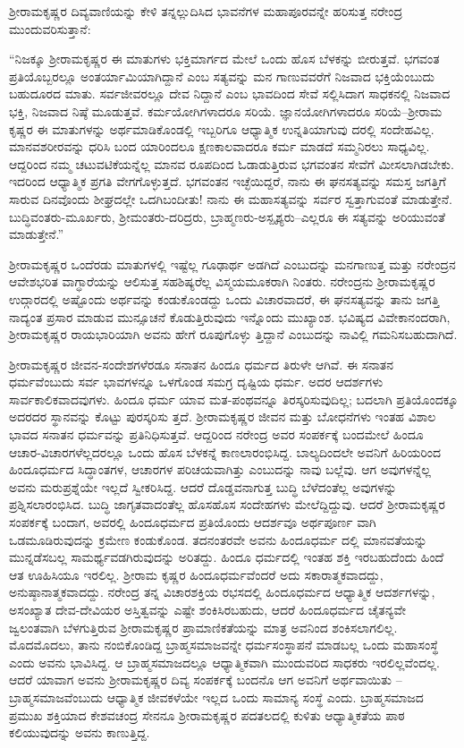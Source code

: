 ಶ್ರೀರಾಮಕೃಷ್ಣರ ದಿವ್ಯವಾಣಿಯನ್ನು ಕೇಳಿ ತನ್ನಲ್ಲುದಿಸಿದ ಭಾವನೆಗಳ ಮಹಾಪೂರವನ್ನೇ ಹರಿಸುತ್ತ ನರೇಂದ್ರ ಮುಂದುವರಿಸುತ್ತಾನೆ:

“ನಿಜಕ್ಕೂ ಶ್ರೀರಾಮಕೃಷ್ಣರ ಈ ಮಾತುಗಳು ಭಕ್ತಿಮಾರ್ಗದ ಮೇಲೆ ಒಂದು ಹೊಸ ಬೆಳಕನ್ನು ಬೀರುತ್ತವೆ. ಭಗವಂತ ಪ್ರತಿಯೊಬ್ಬರಲ್ಲೂ ಅಂತರ್ಯಾಮಿಯಾಗಿದ್ದಾನೆ ಎಂಬ ಸತ್ಯವನ್ನು ಮನ ಗಾಣುವವರೆಗೆ ನಿಜವಾದ ಭಕ್ತಿಯೆಂಬುದು ಬಹುದೂರದ ಮಾತು. ಸರ್ವಜೀವರಲ್ಲೂ ದೇವ ನಿದ್ದಾನೆ ಎಂಬ ಭಾವದಿಂದ ಸೇವೆ ಸಲ್ಲಿಸಿದಾಗ ಸಾಧಕನಲ್ಲಿ ನಿಜವಾದ ಭಕ್ತಿ, ನಿಜವಾದ ನಿಷ್ಠೆ ಮೂಡುತ್ತವೆ. ಕರ್ಮಯೋಗಿಗಳಾದರೂ ಸರಿಯೆ. ಜ್ಞಾನಯೋಗಿಗಳಾದರೂ ಸರಿಯೆ–ಶ್ರೀರಾಮ ಕೃಷ್ಣರ ಈ ಮಾತುಗಳನ್ನು ಅರ್ಥಮಾಡಿಕೊಂಡಲ್ಲಿ ಇಬ್ಬರಿಗೂ ಆಧ್ಯಾತ್ಮಿಕ ಉನ್ನತಿಯಾಗುವು ದರಲ್ಲಿ ಸಂದೇಹವಿಲ್ಲ. ಮಾನವಶರೀರವನ್ನು ಧರಿಸಿ ಬಂದ ಯಾರಿಂದಲೂ ಕ್ಷಣಕಾಲವಾದರೂ ಕರ್ಮ ಮಾಡದೆ ಸಮ್ಮನಿರಲು ಸಾಧ್ಯವಿಲ್ಲ. ಆದ್ದರಿಂದ ನಮ್ಮ ಚಟುವಟಿಕೆಯನ್ನೆಲ್ಲ ಮಾನವ ರೂಪದಿಂದ ಓಡಾಡುತ್ತಿರುವ ಭಗವಂತನ ಸೇವೆಗೆ ಮೀಸಲಾಗಿಡಬೇಕು. ಇದರಿಂದ ಆಧ್ಯಾತ್ಮಿಕ ಪ್ರಗತಿ ವೇಗಗೊಳ್ಳುತ್ತದೆ. ಭಗವಂತನ ಇಚ್ಛೆಯಿದ್ದರೆ, ನಾನು ಈ ಘನಸತ್ಯವನ್ನು ಸಮಸ್ತ ಜಗತ್ತಿಗೆ ಸಾರುವ ದಿನವೊಂದು ಶೀಘ್ರದಲ್ಲೇ ಒದಗಿಬಂದೀತು! ನಾನು ಈ ಮಹಾಸತ್ಯವನ್ನು ಸರ್ವರ ಸ್ವತ್ತಾಗುವಂತೆ ಮಾಡುತ್ತೇನೆ. ಬುದ್ಧಿವಂತರು-ಮೂರ್ಖರು, ಶ್ರೀಮಂತರು-ದರಿದ್ರರು, ಬ್ರಾಹ್ಮಣರು-ಅಸ್ಪೃಶ್ಯರು–ಎಲ್ಲರೂ ಈ ಸತ್ಯವನ್ನು ಅರಿಯುವಂತೆ ಮಾಡುತ್ತೇನೆ.”

ಶ್ರೀರಾಮಕೃಷ್ಣರ ಒಂದೆರಡು ಮಾತುಗಳಲ್ಲಿ ಇಷ್ಟೆಲ್ಲ ಗೂಢಾರ್ಥ ಅಡಗಿದೆ ಎಂಬುದನ್ನು ಮನಗಾಣುತ್ತ ಮತ್ತು ನರೇಂದ್ರನ ಆವೇಶಭರಿತ ವಾಗ್ಧಾರೆಯನ್ನು ಆಲಿಸುತ್ತ ಸಹಶಿಷ್ಯರೆಲ್ಲ ವಿಸ್ಮಯಮೂಕರಾಗಿ ನಿಂತರು. ನರೇಂದ್ರನು ಶ್ರೀರಾಮಕೃಷ್ಣರ ಉದ್ಗಾರದಲ್ಲಿ ಅಷ್ಟೊಂದು ಅರ್ಥವನ್ನು ಕಂಡುಕೊಂಡದ್ದು ಒಂದು ವಿಚಾರವಾದರೆ, ಈ ಘನಸತ್ಯವನ್ನು ತಾನು ಜಗತ್ತಿ ನಾದ್ಯಂತ ಪ್ರಸಾರ ಮಾಡುವ ಮುನ್ಸೂಚನೆ ಕೊಡುತ್ತಿರುವುದು ಇನ್ನೊಂದು ಮುಖ್ಯಾಂಶ. ಭವಿಷ್ಯದ ವಿವೇಕಾನಂದರಾಗಿ, ಶ್ರೀರಾಮಕೃಷ್ಣರ ರಾಯಭಾರಿಯಾಗಿ ಅವನು ಹೇಗೆ ರೂಪುಗೊಳ್ಳು ತ್ತಿದ್ದಾನೆ ಎಂಬುದನ್ನು ನಾವಿಲ್ಲಿ ಗಮನಿಸಬಹುದಾಗಿದೆ.

ಶ್ರೀರಾಮಕೃಷ್ಣರ ಜೀವನ-ಸಂದೇಶಗಳೆರಡೂ ಸನಾತನ ಹಿಂದೂ ಧರ್ಮದ ತಿರುಳೇ ಆಗಿವೆ. ಈ ಸನಾತನ ಧರ್ಮವೆಂಬುದು ಸರ್ವ ಭಾವಗಳನ್ನೂ ಒಳಗೊಂಡ ಸಮಗ್ರ ದೃಷ್ಟಿಯ ಧರ್ಮ. ಅದರ ಆದರ್ಶಗಳು ಸಾರ್ವಕಾಲಿಕವಾದವುಗಳು. ಹಿಂದೂ ಧರ್ಮ ಯಾವ ಮತ-ಪಂಥವನ್ನೂ ತಿರಸ್ಕರಿಸುವುದಿಲ್ಲ; ಬದಲಾಗಿ ಪ್ರತಿಯೊಂದಕ್ಕೂ ಅದರದರ ಸ್ಥಾನವನ್ನು ಕೊಟ್ಟು ಪುರಸ್ಕರಿಸು ತ್ತದೆ. ಶ್ರೀರಾಮಕೃಷ್ಣರ ಜೀವನ ಮತ್ತು ಬೋಧನೆಗಳು ಇಂತಹ ವಿಶಾಲ ಭಾವದ ಸನಾತನ ಧರ್ಮವನ್ನು ಪ್ರತಿನಿಧಿಸುತ್ತವೆ. ಆದ್ದರಿಂದ ನರೇಂದ್ರ ಅವರ ಸಂಪರ್ಕಕ್ಕೆ ಬಂದಮೇಲೆ ಹಿಂದೂ ಆಚಾರ-ವಿಚಾರಗಳೆಲ್ಲದರಲ್ಲೂ ಒಂದು ಹೊಸ ಬೆಳಕನ್ನೆ ಕಾಣಲಾರಂಭಿಸಿದ್ದ. ಬಾಲ್ಯದಿಂದಲೇ ಅವನಿಗೆ ಹಿರಿಯರಿಂದ ಹಿಂದೂಧರ್ಮದ ಸಿದ್ಧಾಂತಗಳ, ಆಚಾರಗಳ ಪರಿಚಯವಾಗಿತ್ತು ಎಂಬುದನ್ನು ನಾವು ಬಲ್ಲೆವು. ಆಗ ಅವುಗಳನ್ನೆಲ್ಲ ಅವನು ಮರುಪ್ರಶ್ನೆಯೇ ಇಲ್ಲದೆ ಸ್ವೀಕರಿಸಿದ್ದ. ಆದರೆ ದೊಡ್ಡವನಾಗುತ್ತ ಬುದ್ಧಿ ಬೆಳೆದಂತೆಲ್ಲ ಅವುಗಳನ್ನು ಪ್ರಶ್ನಿಸಲಾರಂಭಿಸಿದ. ಬುದ್ಧಿ ಜಾಗೃತವಾದಂತೆಲ್ಲ ಹೊಸಹೊಸ ಸಂದೇಹಗಳು ಮೇಲೆದ್ದಿದ್ದುವು. ಆದರೆ ಶ್ರೀರಾಮಕೃಷ್ಣರ ಸಂಪರ್ಕಕ್ಕೆ ಬಂದಾಗ, ಅವರಲ್ಲಿ ಹಿಂದೂಧರ್ಮದ ಪ್ರತಿಯೊಂದು ಆದರ್ಶವೂ ಅರ್ಥಪೂರ್ಣ ವಾಗಿ ಒಡಮೂಡಿರುವುದನ್ನು ಕ್ರಮೇಣ ಕಂಡುಕೊಂಡ. ತದನಂತರವೇ ಅವನು ಹಿಂದೂಧರ್ಮ ದಲ್ಲಿ ಮಾನವತೆಯನ್ನು ಮುನ್ನಡೆಸಬಲ್ಲ ಸಾಮರ್ಥ್ಯವಡಗಿರುವುದನ್ನು ಅರಿತದ್ದು. ಹಿಂದೂ ಧರ್ಮದಲ್ಲಿ ಇಂತಹ ಶಕ್ತಿ ಇರಬಹುದೆಂದು ಹಿಂದೆ ಆತ ಊಹಿಸಿಯೂ ಇರಲಿಲ್ಲ. ಶ್ರೀರಾಮ ಕೃಷ್ಣರ ಹಿಂದೂಧರ್ಮವೆಂದರೆ ಅದು ಸಕಾರಾತ್ಮಕವಾದದ್ದು, ಅನುಷ್ಠಾನಾತ್ಮಕವಾದದ್ದು. ನರೇಂದ್ರ ತನ್ನ ವಿಚಾರಶಕ್ತಿಯ ರಭಸದಲ್ಲಿ ಹಿಂದೂಧರ್ಮದ ಆಧ್ಯಾತ್ಮಿಕ ಆದರ್ಶಗಳನ್ನು, ಅಸಂಖ್ಯಾತ ದೇವ-ದೇವಿಯರ ಅಸ್ತಿತ್ವವನ್ನು ಎಷ್ಟೇ ಶಂಕಿಸಿರಬಹುದು, ಆದರೆ ಹಿಂದೂಧರ್ಮದ ಚೈತನ್ಯವೇ ಜ್ವಲಂತವಾಗಿ ಬೆಳಗುತ್ತಿರುವ ಶ್ರೀರಾಮಕೃಷ್ಣರ ಪ್ರಾಮಾಣಿಕತೆಯನ್ನು ಮಾತ್ರ ಅವನಿಂದ ಶಂಕಿಸಲಾಗಲಿಲ್ಲ. ಮೊದಮೊದಲು, ತಾನು ನಂಬಿಕೊಂಡಿದ್ದ ಬ್ರಾಹ್ಮಸಮಾಜವನ್ನೇ ಧರ್ಮಸಂಸ್ಥಾಪನೆ ಮಾಡಬಲ್ಲ ಒಂದು ಮಹಾಸಂಸ್ಥೆ ಎಂದು ಅವನು ಭಾವಿಸಿದ್ದ. ಆ ಬ್ರಾಹ್ಮಸಮಾಜದಲ್ಲೂ ಆಧ್ಯಾತ್ಮಿಕವಾಗಿ ಮುಂದುವರಿದ ಸಾಧಕರು ಇರಲಿಲ್ಲವೆಂದಲ್ಲ. ಆದರೆ ಯಾವಾಗ ಅವನು ಶ್ರೀರಾಮಕೃಷ್ಣರ ದಿವ್ಯ ಸಂಪರ್ಕಕ್ಕೆ ಬಂದನೊ ಆಗ ಅವನಿಗೆ ಅರ್ಥವಾಯಿತು –ಬ್ರಾಹ್ಮಸಮಾಜವೆಂಬುದು ಆಧ್ಯಾತ್ಮಿಕ ಜೀವಕಳೆಯೇ ಇಲ್ಲದ ಒಂದು ಸಾಮಾನ್ಯ ಸಂಸ್ಥೆ ಎಂದು. ಬ್ರಾಹ್ಮಸಮಾಜದ ಪ್ರಮುಖ ಶಕ್ತಿಯಾದ ಕೇಶವಚಂದ್ರ ಸೇನನೂ ಶ್ರೀರಾಮಕೃಷ್ಣರ ಪದತಲದಲ್ಲಿ ಕುಳಿತು ಆಧ್ಯಾತ್ಮಿಕತೆಯ ಪಾಠ ಕಲಿಯುವುದನ್ನು ಅವನು ಕಾಣುತ್ತಿದ್ದ.

